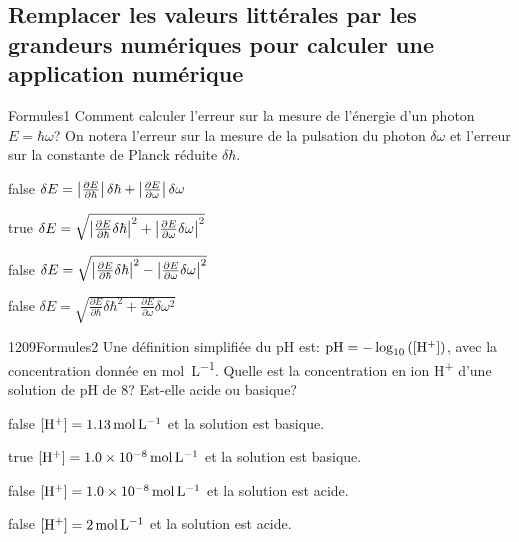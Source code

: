 \documentclass[11pt]{article}
\begin{document}
    \subsection{Remplacer les valeurs littérales par les grandeurs numériques pour calculer une application numérique}
		\begin{question}{}{Formules}{1}{}
			Comment calculer l'erreur sur la mesure de l'énergie d'un photon $E=\hbar\omega$? On notera l'erreur sur la mesure de la pulsation du photon $\delta\omega$ et l'erreur sur la constante de Planck réduite $\delta\hbar$.
        \end{question}
        \begin{reponses}
    	    \item[false] $\delta E = \left|{\frac{\partial E}{\partial \hbar}}\right|\delta \hbar+\left|{\frac{\partial E}{\partial \omega}}\right|\delta \omega$
		    \item[true] $\delta E = \sqrt{\left|{\frac{\partial E}{\partial \hbar}\delta \hbar}\right|^2+\left|{\frac{\partial E}{\partial \omega}\delta \omega}\right|^2}$
		    \item[false] $\delta E = \sqrt{\left|{\frac{\partial E}{\partial \hbar}\delta \hbar}\right|^2-\left|{\frac{\partial E}{\partial \omega}\delta \omega}\right|^2}$
		    \item[false] $\delta E = \sqrt{\frac{\partial E}{\partial \hbar}\delta \hbar^2+\frac{\partial E}{\partial \omega}\delta \omega^2}$
        \end{reponses}
        
        \begin{question}{1209}{Formules}{2}{}
			Une définition simplifiée du pH est: $\text{pH} = -\log_{10}\left(\text{[H\textsuperscript{+}]}\right)$, avec la concentration donnée en \si{\mol\per\liter}. Quelle est la concentration en ion H\textsuperscript{+} d'une solution de pH de 8? Est-elle acide ou basique?
        \end{question}
        \begin{reponses}
    	    \item[false] $\text{[H\textsuperscript{+}]} = \SI{1.13}{\mol\per\liter}$ et la solution est basique.
    	    \item[true] $\text{[H\textsuperscript{+}]} = \SI{1.0e-8}{\mol\per\liter}$ et la solution est basique.
    	    \item[false] $\text{[H\textsuperscript{+}]} = \SI{1.0e-8}{\mol\per\liter}$ et la solution est acide.
    	    \item[false] $\text{[H\textsuperscript{+}]} = \SI{2}{\mol\per\liter}$ et la solution est acide.
        \end{reponses}
        
\end{document}
